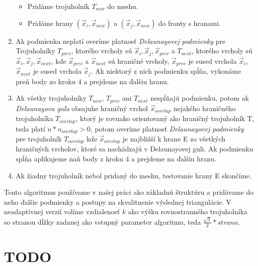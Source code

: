 \begin{enumerate}
{\begin{itemize}
        \item{Pridáme trojuholník $T_{new}$ do meshu.}
        \item{Pridáme hrany $(\overrightarrow{x}_i, \overrightarrow{x}_{new})$ a 
        $(\overrightarrow{x}_j, \overrightarrow{x}_{new})$ do fronty s hranami.}
    \end{itemize}
    }
    \item{
        Ak podmienka neplatí overíme platnosť \textit{Delaunayovej podmienky} pre Trojuholníky 
        $T_{prev}$, ktorého vrcholy sú $\overrightarrow{x}_i, \overrightarrow{x}_j, 
        \overrightarrow{x}_{prev}$ a $T_{next}$, ktorého vrcholy sú 
        $\overrightarrow{x}_i, \overrightarrow{x}_j, \overrightarrow{x}_{next}$, kde 
        $\overrightarrow{x}_{prev}$ a $\overrightarrow{x}_{next}$ sú hraničné vrcholy, 
        $\overrightarrow{x}_{prev}$ 
        je sused vrchola $\overrightarrow{x}_i$, $\overrightarrow{x}_{next}$ je sused vrchola 
        $\overrightarrow{x}_j$. Ak niektorý z nich podmienku
        spĺňa, vykonáme preň body zo kroku 4 a prejdeme na ďalšiu hranu.
    }
    \item{
        Ak všetky trojuholníky $T_{new}$, $T_{prev}$ ani $T_{next}$ nespĺňajú podmienku, potom 
        ak \textit{Delaunayova guľa} obsajuhe hraničný vrchol $\overrightarrow{x}_{overlap}$ nejakého hraničného 
        trojuholníka $T_{overlap}$, ktorý je rovnako orientovaný ako hraničný trojuholník T, teda
        platí $n*n_{overlap} > 0$, potom overíme platnosť \textit{Delaunayovej podmienky} pre 
        trojuholník $T_{overlap}$ kde $\overrightarrow{x}_{overlap}$ je najbližší k hrane E zo všetkých hraničných
        vrcholov, ktoré sa nachádzajú v Delaunayovej guli. Ak podmienku spĺňa aplikujeme naň body z 
        kroku 4 a prejdeme na ďalšiu hranu.
    }
    \item{
        Ak žiadny trojuholník nebol pridaný do meshu, testovanie hrany E skončíme.
    }
\end{enumerate}

Tento algoritmus používame v našej práci ako základnú štruktúru a pridávame do neho ďalšie podmienky 
a postupy na skvalitnenie výslednej triangulácie. V neadaptívnej verzií volíme vzdialenosť $k$ ako 
výšku rovnostranného trojuholníka so stranou dĺžky zadanej ako vstupný parameter algoritmu, teda 
$\frac{\sqrt{3}}{2}*strana$.

\section{TODO}

